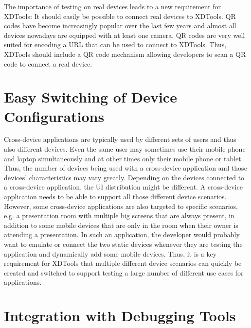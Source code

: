The importance of testing on real devices leads to a new requirement for XDTools: It should easily be possible to connect real devices to XDTools. QR codes have become increasingly popular over the last few years and almost all devices nowadays are equipped with at least one camera. QR codes are very well suited for encoding a URL that can be used to connect to XDTools. Thus, XDTools should include a QR code mechanism allowing developers to scan a QR code to connect a real device.

\section{Easy Switching of Device Configurations}

Cross-device applications are typically used by different sets of users and thus also different devices. Even the same user may sometimes use their mobile phone and laptop simultaneously and at other times only their mobile phone or tablet. Thus, the number of devices being used with a cross-device application and those devices' characteristics may vary greatly. Depending on the devices connected to a cross-device application, the UI distribution might be different. A cross-device application needs to be able to support all those different device scenarios. However, some cross-device applications are also targeted to specific scenarios, e.g. a presentation room with multiple big screens that are always present, in addition to some mobile devices that are only in the room when their owner is attending a presentation. In such an application, the developer would probably want to emulate or connect the two static devices whenever they are testing the application and dynamically add some mobile devices. Thus, it is a key requirement for XDTools that multiple different device scenarios can quickly be created and switched to support testing a large number of different use cases for applications. 

\section{Integration with Debugging Tools}

